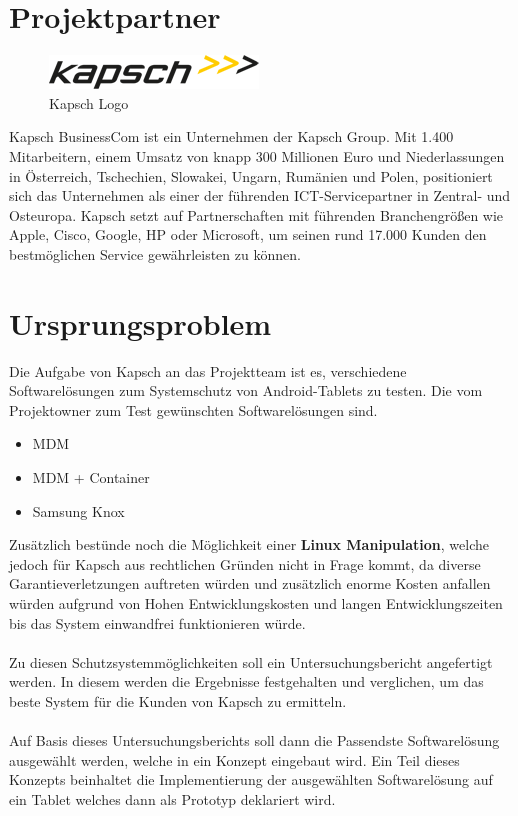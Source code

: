 \newpage

\section{Projektpartner}
\begin{figure}[H]
\includegraphics[scale=1.0]{Images/kapsch_logo}
\caption{Kapsch Logo}
\end{figure}
Kapsch BusinessCom ist ein Unternehmen der Kapsch Group. Mit 1.400 Mitarbeitern, einem Umsatz von knapp 300 Millionen Euro und Niederlassungen in Österreich, Tschechien, Slowakei, Ungarn, Rumänien und Polen, positioniert sich das Unternehmen als einer der führenden ICT-Servicepartner in Zentral- und Osteuropa. Kapsch setzt auf Partnerschaften mit führenden Branchengrößen wie Apple, Cisco, Google, HP oder Microsoft, um seinen rund 17.000 Kunden den bestmöglichen Service gewährleisten zu können.

\section{Ursprungsproblem}
Die Aufgabe von Kapsch an das Projektteam ist es, verschiedene Softwarelösungen zum Systemschutz von Android-Tablets zu testen. Die vom Projektowner zum Test gewünschten Softwarelösungen sind.
\begin{itemize}
	\item MDM
	\item MDM + Container
	\item Samsung Knox
\end{itemize}
Zusätzlich bestünde noch die Möglichkeit einer \textbf {Linux Manipulation}, welche jedoch für Kapsch aus rechtlichen Gründen nicht in Frage kommt, da diverse Garantieverletzungen auftreten würden und zusätzlich enorme Kosten anfallen würden aufgrund von Hohen Entwicklungskosten und langen Entwicklungszeiten bis das System einwandfrei funktionieren würde.
\paragraph*{}
Zu diesen Schutzsystemmöglichkeiten soll ein Untersuchungsbericht angefertigt werden. In diesem werden die Ergebnisse  festgehalten und verglichen, um das beste System für die Kunden von Kapsch zu ermitteln.
\paragraph*{}
Auf Basis dieses Untersuchungsberichts soll dann die Passendste Softwarelösung ausgewählt werden, welche in ein Konzept eingebaut wird. Ein Teil dieses Konzepts beinhaltet die Implementierung der ausgewählten Softwarelösung auf ein Tablet welches dann als Prototyp deklariert wird. 
